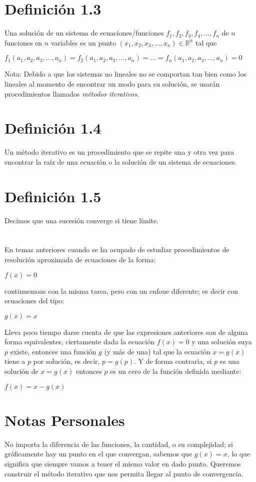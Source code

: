 \documentclass[12pt]{article}
\begin{document}
    \section*{Definición 1.3}
    Una solución de un sistema de ecuaciones/funciones $f_{1}, f_{2}, f_{3}, f_{4}, \dots, f_{n}$ de $n$ funciones en $n$ variables es un punto $(x_{1}, x_{2}, x_{3}, \dots, x_{n}) \in \mathbb{R}^{n}$ tal que 
    \begin{center}
        $f_{1}(a_{1}, a_{2}, a_{3}, \dots, a_{n}) = f_{2}(a_{1}, a_{2}, a_{3}, \dots, a_{n}) = \dots = f_{n}(a_{1}, a_{2}, a_{3}, \dots, a_{n}) = 0  $
    \end{center}
    \small{Nota: Debido a que los sistemas no lineales no se comportan tan bien como los lineales al momento de encontrar un modo para su solución, se usarán procedimientos llamados \it{métodos iterativos}.}
    \section*{Definición 1.4}
    Un método iterativo es un procedimiento que se repite una y otra vez para encontrar la raíz de una ecuación o la solución de un sistema de ecuaciones.
    \section*{Definición 1.5}
    Decimos que una sucesión converge si tiene límite.
    \section*{}
    En temas anteriores cuando se ha ocupado de estudiar procedimientos de resolución aproximada de ecuaciones de la forma:
    \begin{center}
        $f(x) = 0$
    \end{center}
    continuemoas con la misma tarea, pero con un enfoue diferente; es decir con ecuaciones del tipo:
    \begin{center}
        $g(x) = x$
    \end{center}
    Lleva poco tiempo darse cuenta de que las expresiones anteriores son de alguna forma equivalentes, ciertamente dada la ecuación $f(x) = 0$ y una solución suya $p$ existe, entonces una función $g$ (y más de una) tal que la ecuación $x=g(x)$ tiene a $p$ por solución, es decir, $p=g(p)$. Y de forma contraria, si $p$ es una solución de $x=g(x)$ entonces $p$ es un cero de la función definida mediante:
    \begin{center}
        $f(x) = x - g(x)$
    \end{center}
    \section*{Notas Personales}
    No importa la diferencia de las funciones, la cantidad, o su complejidad; si gráficamente hay un punto en el que convergan, sabemos que $g(x)=x$, lo que significa que siempre vamos a tener el mismo valor en dado punto.
    Queremos construir el método iterativo que nos permita llegar al punto de convergencia.
\end{document}
